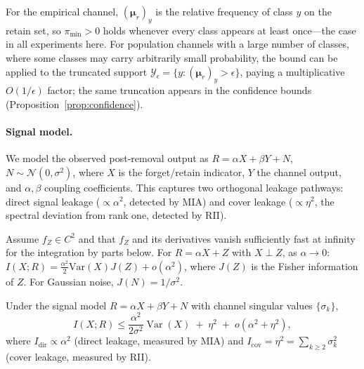 \documentclass[smallextended]{svjour3}       %
\begin{document}
\begin{remark}[On $\pi_{\min}>0$]
\label{rem:pi_min}
For the empirical channel, $(\boldsymbol{\mu}_r)_y$ is the relative frequency of class $y$ on the retain set, so $\pi_{\min}>0$ holds whenever every class appears at least once---the case in all experiments here. For population channels with a large number of classes, where some classes may carry arbitrarily small probability, the bound can be applied to the truncated support $\mathcal{Y}_\epsilon=\{y:(\boldsymbol{\mu}_r)_y>\epsilon\}$, paying a multiplicative $O(1/\epsilon)$ factor; the same truncation appears in the confidence bounds (Proposition~\ref{prop:confidence}).
\end{remark}

\paragraph{Signal model.}
We model the observed post-removal output as $R = \alpha X + \beta Y + N$, $N \sim \mathcal{N}(0,\sigma^2)$, where $X$ is the forget/retain indicator, $Y$ the channel output, and $\alpha,\beta$ coupling coefficients. This captures two orthogonal leakage pathways: direct signal leakage ($\propto \alpha^2$, detected by MIA) and cover leakage ($\propto \eta^2$, the spectral deviation from rank one, detected by RII).

\begin{lemma}
\label{lem:fisher}
Assume $f_Z\in C^2$ and that $f_Z$ and its derivatives vanish sufficiently fast at infinity for the integration by parts below. For $R = \alpha X + Z$ with $X \perp Z$, as $\alpha \to 0$:
$I(X;R) = \frac{\alpha^2}{2}\mathrm{Var}(X)J(Z) + o(\alpha^2)$, where $J(Z)$ is the Fisher information of $Z$. For Gaussian noise, $J(N) = 1/\sigma^2$.
\end{lemma}

\begin{theorem}
\label{thm:unified}
Under the signal model $R = \alpha X + \beta Y + N$ with channel singular values $\{\sigma_k\}$,
\begin{equation}
I(X; R) \le \frac{\alpha^2}{2\sigma^2}\operatorname{Var}(X) \;+\; \eta^2 \;+\; o(\alpha^2 + \eta^2),
\end{equation}
where $I_{\mathrm{dir}} \propto \alpha^2$ (direct leakage, measured by MIA) and $I_{\mathrm{cov}} = \eta^2 = \sum_{k\ge 2}\sigma_k^2$ (cover leakage, measured by RII).
\end{theorem}
\end{document}
